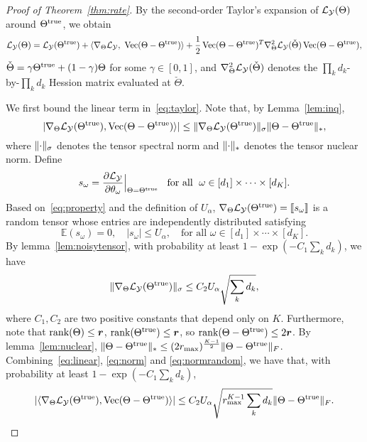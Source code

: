 \documentclass[11pt]{article}
\theoremstyle{plain}
\theoremstyle{definition}
\begin{document}
\begin{proof}[Proof of Theorem~\ref{thm:rate}]
By the second-order Taylor's expansion of $\mathcal{L}_{\mathcal{Y}}(\Theta)$ around $\Theta^{\text{true}}$, we obtain
\begin{equation}\label{eq:taylor}
\flogl(\Theta)=\flogl(\trueT)+\langle\fplogl,\ \Vec(\Theta-\trueT)\rangle+{1\over 2}\Vec(\Theta-\trueT)^T\fpplogl(\check\Theta)\Vec(\Theta-\trueT),
\end{equation}
$\check\Theta=\gamma\Theta^{\text{true}}+(1-\gamma)\Theta$ for some $\gamma\in[0,1]$, and $\nabla^2_{\Theta}\mathcal{L}_{\mathcal{Y}}(\check\Theta)$ denotes the $\prod_kd_k$-by-$\prod_k d_k$ Hession matrix evaluated at $\check\Theta$. 

We first bound the linear term in~\eqref{eq:taylor}. Note that, by Lemma~\ref{lem:inq}, 
\begin{equation}\label{eq:linear}
|\nabla_{\Theta}\mathcal{L}_{\mathcal{Y}}(\Theta^{\text{true}}), \operatorname{Vec}(\Theta-\Theta^{\text{true}})  \rangle|\leq \lVert\nabla_{\Theta}\mathcal{L}_{\mathcal{Y}}(\Theta^{\text{true}})\rVert_\sigma \lVert\Theta-\Theta^{\text{true}}\rVert_*,
\end{equation}
where $\lVert\cdot\rVert_\sigma$ denotes the tensor spectral norm and $\lVert\cdot\rVert_*$ denotes the tensor nuclear norm. Define 
\[
s_\omega={\partial \mathcal{L}_{\mathcal{Y}}\over \partial \theta_\omega}\Big|_{\Theta=\Theta^{\text{true}}} \;\; \textrm{ for all } \; \omega\in[d_1]\times\cdots\times [d_K].
\]
Based on~\eqref{eq:property} and the definition of $U_\alpha$, $\nabla_{\Theta}\mathcal{L}_{\mathcal{Y}}(\Theta^{\text{true}})=\llbracket s_{\omega} \rrbracket$ is a random tensor whose entries are independently distributed satisfying
\begin{equation}\label{eq:norm}
\mathbb{E}(s_\omega)=0,\quad |s_\omega|\leq U_\alpha, \quad \text{for all }\omega\in[d_1]\times \cdots \times [d_K].
\end{equation}
By lemma~\ref{lem:noisytensor}, with probability at least $1-\exp(-C_1 \sum_kd_k)$, we have
\begin{equation}\label{eq:normrandom} 
\lVert\nabla_{\Theta}\mathcal{L}_{\mathcal{Y}}(\Theta^{\text{true}})\rVert_\sigma \leq C_2 U_\alpha\sqrt{\sum_k d_k},
\end{equation}
where $C_1, C_2$ are two positive constants that depend only on $K$. Furthermore, note that $\text{rank}(\Theta)\leq \bm{r}$, $\text{rank}(\Theta^{\text{true}})\leq \bm{r}$, so $\text{rank}(\Theta-\Theta^{\text{true}})\leq 2\bm{r}$. By lemma~\ref{lem:nuclear}, $\lVert\Theta-\Theta^{\text{true}}\rVert_*\leq (2r_{\max})^{K-1\over 2}\lVert\Theta-\Theta^{\text{true}}\rVert_F$. Combining~\eqref{eq:linear}, \eqref{eq:norm} and \eqref{eq:normrandom}, we have that, with probability at least $1-\exp(-C_1 \sum_kd_k)$,
\begin{equation}\label{eq:linearconclusion}
|\langle \nabla_{\Theta}\mathcal{L}_{\mathcal{Y}}(\Theta^{\text{true}}), \operatorname{Vec}(\Theta-\Theta^{\text{true}})  \rangle | \leq C_2 U_\alpha  \sqrt{r_{\max}^{K-1} \sum_k d_k}  \lVert\Theta-\Theta^{\text{true}}\rVert_F.
\end{equation}


\end{proof}
\end{document}
